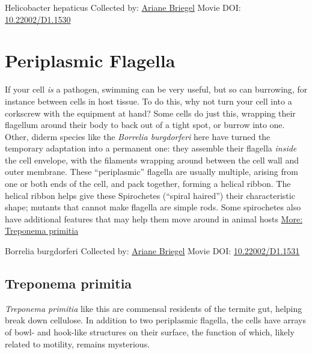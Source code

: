 \documentclass[]{tufte-book}
\begin{document}
\hypertarget{htmlwidget-7eb6f35f7794c65cfebd}{}

\label{fig:6-6}Helicobacter hepaticus Collected by: \protect\hyperlink{ariane_briegel}{Ariane Briegel} Movie DOI: \href{https://doi.org/10.22002/D1.1530}{10.22002/D1.1530}

\hypertarget{periplasmic-flagella}{%
\section{Periplasmic Flagella}\label{periplasmic-flagella}}

If your cell \emph{is} a pathogen, swimming can be very useful, but so can burrowing, for instance between cells in host tissue. To do this, why not turn your cell into a corkscrew with the equipment at hand? Some cells do just this, wrapping their flagellum around their body to back out of a tight spot, or burrow into one. Other, diderm species like the \emph{Borrelia burgdorferi} here have turned the temporary adaptation into a permanent one: they assemble their flagella \emph{inside} the cell envelope, with the filaments wrapping around between the cell wall and outer membrane. These ``periplasmic'' flagella are usually multiple, arising from one or both ends of the cell, and pack together, forming a helical ribbon. The helical ribbon helps give these Spirochetes (``spiral haired'') their characteristic shape; mutants that cannot make flagella are simple rods. Some spirochetes also have additional features that may help them move around in animal hosts \protect\hyperlink{Treponema_primitia}{More: Treponema primitia}



\hypertarget{htmlwidget-21e12ede41139df4723a}{}

\label{fig:6-7}Borrelia burgdorferi Collected by: \protect\hyperlink{ariane_briegel}{Ariane Briegel} Movie DOI: \href{https://doi.org/10.22002/D1.1531}{10.22002/D1.1531}

\hypertarget{Treponema_primitia}{%
\subsection{Treponema primitia}\label{Treponema_primitia}}

\emph{Treponema primitia} like this are commensal residents of the termite gut, helping break down cellulose. In addition to two periplasmic flagella, the cells have arrays of bowl- and hook-like structures on their surface, the function of which, likely related to motility, remains mysterious.
\end{document}
